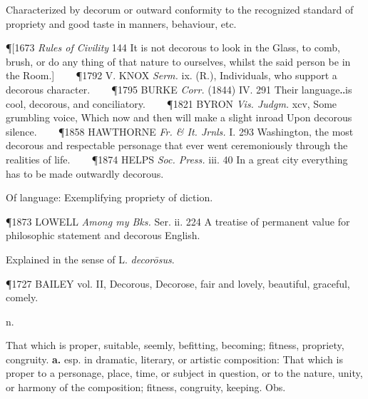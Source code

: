 \begin{description}[wide, labelwidth=!, labelindent=0pt]
\begin{myenumerate}
 Characterized by decorum or outward conformity to the recognized standard of propriety and good taste in manners, behaviour, etc.

\P [1673 \textit{Rules  of Civility} 144 It is not decorous to look in the Glass, to comb, brush, or do any thing of that nature to ourselves, whilst the said person be in the Room.]    
\P 1792 V. KNOX  \textit{Serm.} ix. (R.), Individuals, who support a decorous character.    
\P 1795 BURKE  \textit{Corr.} (1844) IV. 291 Their language‥is cool, decorous, and conciliatory.    
\P 1821 BYRON  \textit{Vis. Judgm.} xcv, Some grumbling voice, Which now and then will make a slight inroad Upon decorous silence.    
\P 1858 HAWTHORNE  \textit{Fr. \& It. Jrnls.} I. 293 Washington, the most decorous and respectable personage that ever went ceremoniously through the realities of life.    
\P 1874 HELPS  \textit{Soc. Press.} iii. 40 In a great city everything has to be made outwardly decorous.

 Of language: Exemplifying propriety of diction.

\P 1873 LOWELL  \textit{Among my Bks.} Ser. ii. 224 A treatise of permanent value for philosophic statement and decorous English.

\noindent Explained in the sense of L. \textit{decorōsus}.

\P 1727 BAILEY  vol. II, Decorous, Decorose, fair and lovely, beautiful, graceful, comely.
\end{myenumerate}


 n.

\noindent {}

\vspace{-0.3cm}

\begin{myenumerate}

 That which is proper, suitable, seemly, befitting, becoming; fitness, propriety, congruity. \textbf{a.} esp. in dramatic, literary, or artistic composition: That which is proper to a personage, place, time, or subject in question, or to the nature, unity, or harmony of the composition; fitness, congruity, keeping. Obs.


\end{myenumerate}
\end{description}
